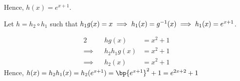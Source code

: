 \documentclass{echw}
\begin{document}
                Hence, $h(x) = e^{x+1}$.


            \subpart
                Let $h = h_2 \circ h_1$ such that $h_1g(x) = x \implies h_1(x) = g^{-1}(x) \implies h_1(x) = e^{x+1}$.

                \begin{alignat*}{2}
                    &&hg(x) &= x^2+1\\
                    \implies&&h_2h_1g(x) &= x^2+1\\
                    \implies&&h_2(x) &= x^2+1
                \end{alignat*}
                Hence, $h(x) = h_2h_1(x) = h_2(e^{x+1}) = \bp{e^{x+1}}^2 + 1 = e^{2x+2} + 1$

\end{document}
